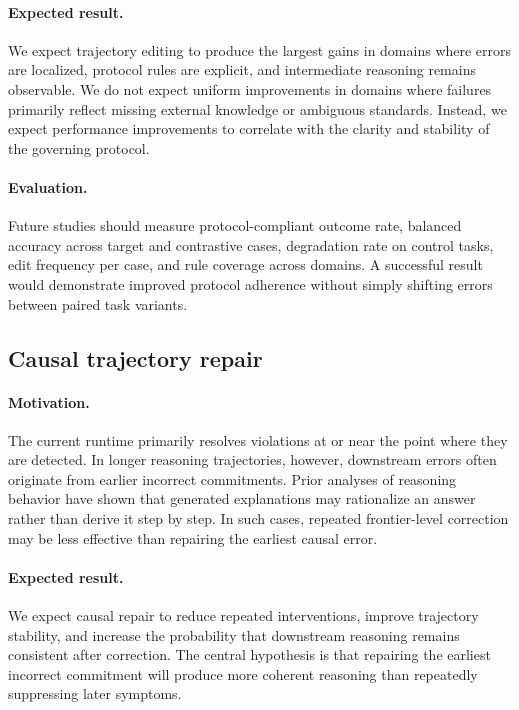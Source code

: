 \documentclass[twocolumn]{article}
\begin{document}
\paragraph{Expected result.}
We expect trajectory editing to produce the largest gains in domains where
errors are localized, protocol rules are explicit, and intermediate reasoning
remains observable. We do not expect uniform improvements in domains where
failures primarily reflect missing external knowledge or ambiguous standards.
Instead, we expect performance improvements to correlate with the clarity and
stability of the governing protocol.

\paragraph{Evaluation.}
Future studies should measure protocol-compliant outcome rate, balanced accuracy
across target and contrastive cases, degradation rate on control tasks, edit
frequency per case, and rule coverage across domains. A successful result would
demonstrate improved protocol adherence without simply shifting errors between
paired task variants.

\subsection{Causal trajectory repair}

\paragraph{Motivation.}
The current runtime primarily resolves violations at or near the point where
they are detected. In longer reasoning trajectories, however, downstream errors
often originate from earlier incorrect commitments. Prior analyses of reasoning
behavior have shown that generated explanations may rationalize an answer rather
than derive it step by step. In such cases, repeated frontier-level correction
may be less effective than repairing the earliest causal error.

\paragraph{Expected result.}
We expect causal repair to reduce repeated interventions, improve trajectory
stability, and increase the probability that downstream reasoning remains
consistent after correction. The central hypothesis is that repairing the
earliest incorrect commitment will produce more coherent reasoning than
repeatedly suppressing later symptoms.
\end{document}
